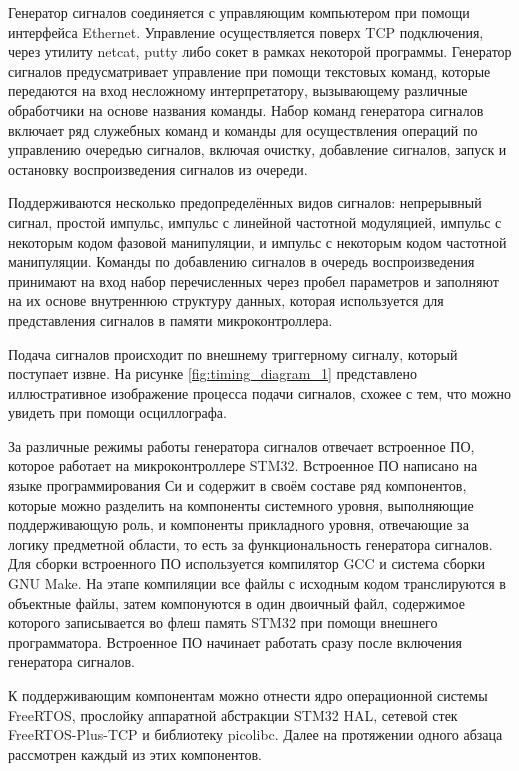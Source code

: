 \documentclass{report}
\begin{document}
Генератор сигналов соединяется с управляющим компьютером при помощи интерфейса Ethernet. Управление осуществляется поверх TCP подключения, через утилиту netcat, putty либо сокет в рамках некоторой программы. Генератор сигналов предусматривает управление при помощи текстовых команд, которые передаются на вход несложному интерпретатору, вызывающему различные обработчики на основе названия команды. Набор команд генератора сигналов включает ряд служебных команд и команды для осуществления операций по управлению очередью сигналов, включая очистку, добавление сигналов, запуск и остановку воспроизведения сигналов из очереди.

Поддерживаются несколько предопределённых видов сигналов: непрерывный сигнал, простой импульс, импульс с линейной частотной модуляцией, импульс с некоторым кодом фазовой манипуляции, и импульс с некоторым кодом частотной манипуляции. Команды по добавлению сигналов в очередь воспроизведения принимают на вход набор перечисленных через пробел параметров и заполняют на их основе внутреннюю структуру данных, которая используется для представления сигналов в памяти микроконтроллера.

Подача сигналов происходит по внешнему триггерному сигналу, который поступает извне. На рисунке \ref{fig:timing_diagram_1} представлено иллюстративное изображение процесса подачи сигналов, схожее с тем, что можно увидеть при помощи осциллографа.


За различные режимы работы генератора сигналов отвечает встроенное ПО, которое работает на микроконтроллере STM32. Встроенное ПО написано на языке программирования Си и содержит в своём составе ряд компонентов, которые можно разделить на компоненты системного уровня, выполняющие поддерживающую роль, и компоненты прикладного уровня, отвечающие за логику предметной области, то есть за функциональность генератора сигналов. Для сборки встроенного ПО используется компилятор GCC и система сборки GNU Make. На этапе компиляции все файлы с исходным кодом транслируются в объектные файлы, затем компонуются в один двоичный файл, содержимое которого записывается во флеш память STM32 при помощи внешнего программатора. Встроенное ПО начинает работать сразу после включения генератора сигналов.

К поддерживающим компонентам можно отнести ядро операционной системы FreeRTOS, прослойку аппаратной абстракции STM32 HAL, сетевой стек FreeRTOS-Plus-TCP и библиотеку picolibc. Далее на протяжении одного абзаца рассмотрен каждый из этих компонентов.
\end{document}
